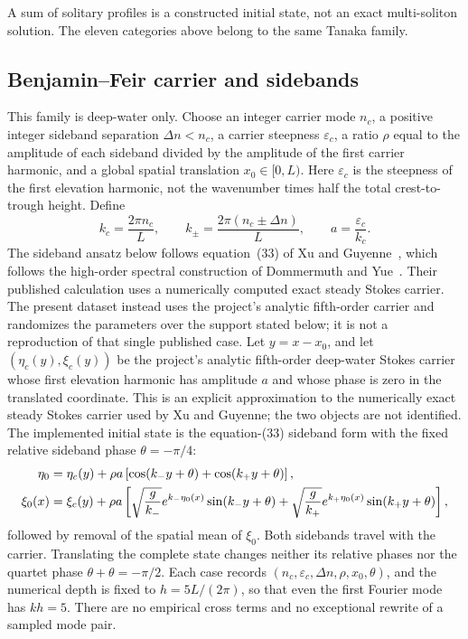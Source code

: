 \documentclass[11pt]{article}
\newcommand{\eps}{\varepsilon}
\begin{document}
A sum of solitary profiles is a constructed initial state, not an exact
multi-soliton solution.  The eleven categories above belong to the same
Tanaka family.

\subsection{Benjamin--Feir carrier and sidebands}

This family is deep-water only.  Choose an integer carrier mode $n_c$, a
positive integer sideband separation $\Delta n<n_c$, a carrier steepness
$\eps_c$, a ratio $\rho$ equal to the amplitude of each sideband divided by
the amplitude of the first carrier harmonic, and a global spatial
translation $x_0\in[0,L)$.  Here $\eps_c$ is the steepness of the first
elevation harmonic, not the wavenumber times half the total crest-to-trough
height.  Define
\begin{equation}
  k_c=\frac{2\pi n_c}{L},\qquad
  k_\pm=\frac{2\pi(n_c\pm\Delta n)}{L},\qquad
  a=\frac{\eps_c}{k_c}.
  \label{eq:bf-wavenumbers}
\end{equation}
The sideband ansatz below follows equation~(33) of Xu and
Guyenne~\cite{xu2009}, which follows the high-order spectral construction of
Dommermuth and Yue~\cite{dommermuth1987}.  Their published calculation uses a
numerically computed exact steady Stokes carrier.  The present dataset instead
uses the project's analytic fifth-order carrier and randomizes the parameters
over the support stated below; it is not a reproduction of that single
published case.
Let $y=x-x_0$, and let $(\eta_c(y),\xi_c(y))$ be the project's analytic
fifth-order deep-water Stokes carrier whose first elevation harmonic has
amplitude $a$ and whose phase is zero in the translated coordinate.  This is
an explicit approximation to the numerically exact steady Stokes carrier
used by Xu and Guyenne; the two objects are not identified.  The implemented
initial state is the equation-(33) sideband form with the fixed relative
sideband phase $\theta=-\pi/4$:
\begin{align}
  \eta_0
    &=\eta_c(y)+\rho a\left[
      \cos(k_-y+\theta)+\cos(k_+y+\theta)\right],\notag\\
  \xi_0(x)
    &=\xi_c(y)+\rho a\left[
      \sqrt{\frac{g}{k_-}}e^{k_-\eta_0(x)}\sin(k_-y+\theta)
      +
      \sqrt{\frac{g}{k_+}}e^{k_+\eta_0(x)}\sin(k_+y+\theta)
      \right],
  \label{eq:bf-constructor}
\end{align}
followed by removal of the spatial mean of $\xi_0$.  Both sidebands travel
with the carrier.  Translating the complete state changes neither its
relative phases nor the quartet phase $\theta+\theta=-\pi/2$.  Each case
records $(n_c,\eps_c,\Delta n,\rho,x_0,\theta)$, and the numerical depth is fixed to
$h=5L/(2\pi)$, so that even the first Fourier mode has $kh=5$.  There are no
empirical cross terms and no exceptional rewrite of a sampled mode pair.
\end{document}
